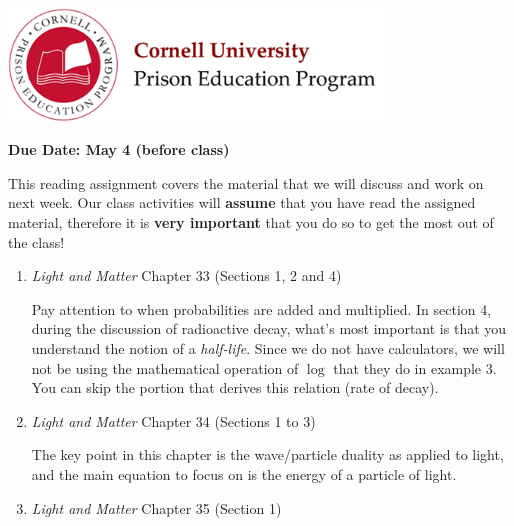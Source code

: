 \documentclass[addpoints,12pt]{exam}
\begin{document}

\begin{flushright}
\vspace{0.2in}

\end{flushright}

\begin{center}
\includegraphics[width=10cm]{../images/logo.png}
\end{center}

\begin{center}
\end{center}

\noindent\begin{large}\textbf{Due Date: May 4 (before class)} \end{large}
\vspace{0.2in}

This reading assignment covers the material that we will discuss and work on next week. Our class activities will \textbf{assume} that you have read the assigned material, therefore it is \textbf{very important} that you do so to get the most out of the class!

\begin{enumerate}


	\item \textit{Light and Matter} Chapter 33 (Sections 1, 2 and 4)
	
	Pay attention to when probabilities are added and multiplied. In section 4, during the discussion of radioactive decay, what's most important is that you understand the notion of a \textit{half-life}. Since we do not have calculators, we will not be using the mathematical operation of $\log$ that they do in example 3. You can skip the portion that derives this relation (rate of decay).
	
	\item \textit{Light and Matter} Chapter 34 (Sections 1 to 3)
	
	The key point in this chapter is the wave/particle duality as applied to light, and the main equation to focus on is the energy of a particle of light.
	
	\item \textit{Light and Matter} Chapter 35 (Section 1)
	
	

	
\end{enumerate}
\end{document}
